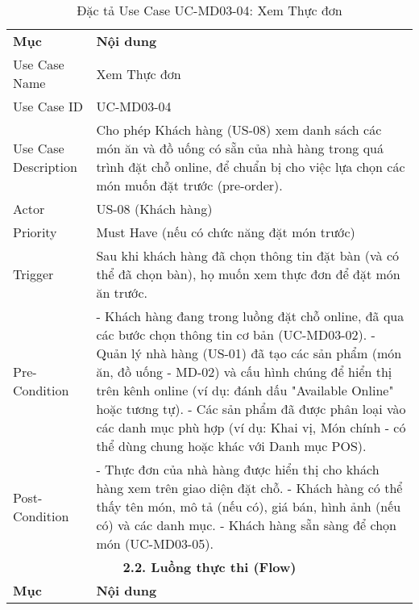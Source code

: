 \begin{longtable}{|m{4cm}|p{11cm}|}
\caption{Đặc tả Use Case UC-MD03-04: Xem Thực đơn} \label{tab:uc_md03_04} \\
\hline

\endhead %
\hline
\endfoot %
\hline
\endlastfoot %
\multicolumn{2}{|c|}{\textbf{2.1. Tóm tắt (Summary)}} \\
\hline
\textbf{Mục} & \textbf{Nội dung} \\
\hline
Use Case Name & Xem Thực đơn \\
\hline
Use Case ID & UC-MD03-04 \\
\hline
Use Case Description & Cho phép Khách hàng (US-08) xem danh sách các món ăn và đồ uống có sẵn của nhà hàng trong quá trình đặt chỗ online, để chuẩn bị cho việc lựa chọn các món muốn đặt trước (pre-order). \\
\hline
Actor & US-08 (Khách hàng) \\
\hline
Priority & Must Have (nếu có chức năng đặt món trước) \\
\hline
Trigger & Sau khi khách hàng đã chọn thông tin đặt bàn (và có thể đã chọn bàn), họ muốn xem thực đơn để đặt món ăn trước. \\
\hline
Pre-Condition & - Khách hàng đang trong luồng đặt chỗ online, đã qua các bước chọn thông tin cơ bản (UC-MD03-02). \newline - Quản lý nhà hàng (US-01) đã tạo các sản phẩm (món ăn, đồ uống - MD-02) và cấu hình chúng để hiển thị trên kênh online (ví dụ: đánh dấu "Available Online" hoặc tương tự). \newline - Các sản phẩm đã được phân loại vào các danh mục phù hợp (ví dụ: Khai vị, Món chính - có thể dùng chung hoặc khác với Danh mục POS). \\
\hline
Post-Condition & - Thực đơn của nhà hàng được hiển thị cho khách hàng xem trên giao diện đặt chỗ. \newline - Khách hàng có thể thấy tên món, mô tả (nếu có), giá bán, hình ảnh (nếu có) và các danh mục. \newline - Khách hàng sẵn sàng để chọn món (UC-MD03-05). \\
\hline
\multicolumn{2}{|c|}{\textbf{2.2. Luồng thực thi (Flow)}} \\
\hline
\textbf{Mục} & \textbf{Nội dung} \\
\hline

\end{longtable}

